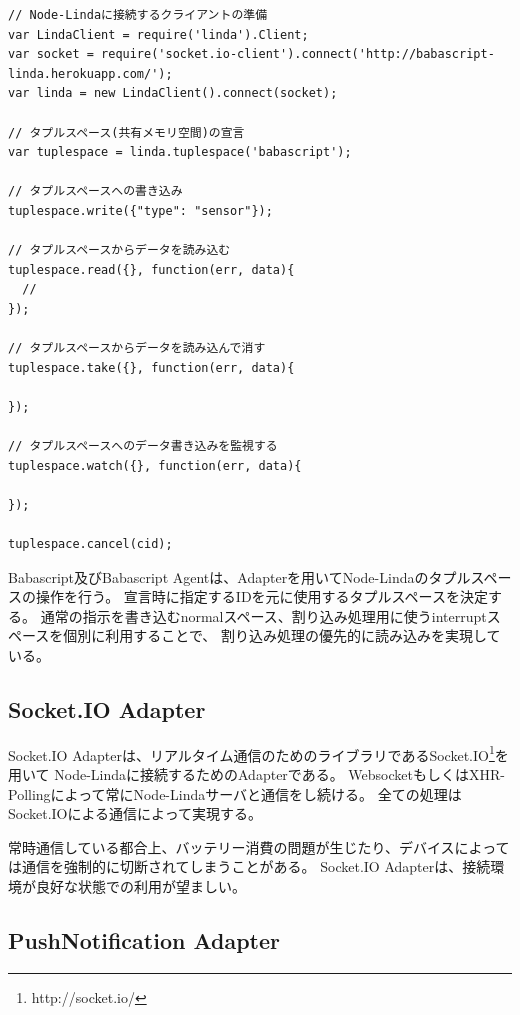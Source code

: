 \begin{lstlisting}[caption=Node-Lindaへの接続方法, label=code:linda-usage]
// Node-Lindaに接続するクライアントの準備
var LindaClient = require('linda').Client;
var socket = require('socket.io-client').connect('http://babascript-linda.herokuapp.com/');
var linda = new LindaClient().connect(socket);

// タプルスペース(共有メモリ空間)の宣言
var tuplespace = linda.tuplespace('babascript');

// タプルスペースへの書き込み
tuplespace.write({"type": "sensor"});

// タプルスペースからデータを読み込む
tuplespace.read({}, function(err, data){
  //
});

// タプルスペースからデータを読み込んで消す
tuplespace.take({}, function(err, data){

});

// タプルスペースへのデータ書き込みを監視する
tuplespace.watch({}, function(err, data){

});

tuplespace.cancel(cid);
\end{lstlisting}

Babascript及びBabascript
Agentは、Adapterを用いてNode-Lindaのタプルスペースの操作を行う。
宣言時に指定するIDを元に使用するタプルスペースを決定する。
通常の指示を書き込むnormalスペース、割り込み処理用に使うinterruptスペースを個別に利用することで、
割り込み処理の優先的に読み込みを実現している。

\subsection{Socket.IO Adapter}\label{socket.io-adapter}

Socket.IO
Adapterは、リアルタイム通信のためのライブラリであるSocket.IO\footnote{http://socket.io/}を用いて
Node-Lindaに接続するためのAdapterである。
WebsocketもしくはXHR-Pollingによって常にNode-Lindaサーバと通信をし続ける。
全ての処理はSocket.IOによる通信によって実現する。

常時通信している都合上、バッテリー消費の問題が生じたり、デバイスによっては通信を強制的に切断されてしまうことがある。
Socket.IO Adapterは、接続環境が良好な状態での利用が望ましい。

\subsection{PushNotification Adapter}\label{pushnotification-adapter}

